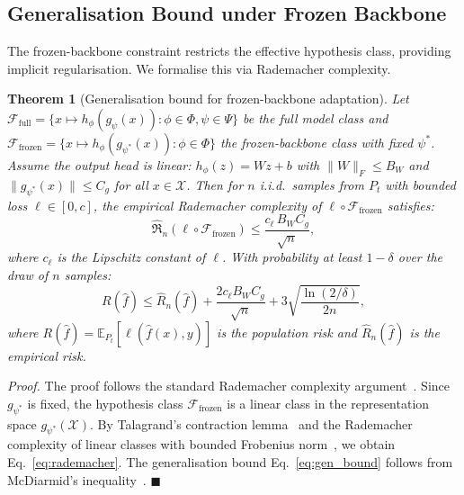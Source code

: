 \documentclass[journal]{IEEEtran}
\newtheorem{theorem}{Theorem}
\renewenvironment{proof}[1][Proof]{\noindent\textit{#1.}\space}{\hfill$\blacksquare$\par\medskip}
\begin{document}
\subsection{Generalisation Bound under Frozen Backbone}
\label{sec:theory_gen}

The frozen-backbone constraint restricts the effective hypothesis class, providing implicit regularisation. We formalise this via Rademacher complexity.

\begin{theorem}[Generalisation bound for frozen-backbone adaptation]
\label{thm:generalization}
Let $\mathcal{F}_{\text{full}} = \{x \mapsto h_\phi(g_\psi(x)) : \phi \in \Phi, \psi \in \Psi\}$ be the full model class and $\mathcal{F}_{\text{frozen}} = \{x \mapsto h_\phi(g_{\psi^*}(x)) : \phi \in \Phi\}$ the frozen-backbone class with fixed $\psi^*$. Assume the output head is linear: $h_\phi(z) = W z + b$ with $\|W\|_F \leq B_W$ and $\|g_{\psi^*}(x)\| \leq C_g$ for all $x \in \mathcal{X}$. Then for $n$ i.i.d.\ samples from $P_t$ with bounded loss $\ell \in [0, c]$, the empirical Rademacher complexity of $\ell \circ \mathcal{F}_{\text{frozen}}$ satisfies:
\begin{equation}
    \hat{\mathfrak{R}}_n(\ell \circ \mathcal{F}_{\text{frozen}}) \leq \frac{c_\ell \, B_W C_g}{\sqrt{n}},
    \label{eq:rademacher}
\end{equation}
where $c_\ell$ is the Lipschitz constant of $\ell$. With probability at least $1 - \delta$ over the draw of $n$ samples:
\begin{equation}
    R(\hat{f}) \leq \hat{R}_n(\hat{f}) + \frac{2 c_\ell B_W C_g}{\sqrt{n}} + 3\sqrt{\frac{\ln(2/\delta)}{2n}},
    \label{eq:gen_bound}
\end{equation}
where $R(\hat{f}) = \mathbb{E}_{P_t}[\ell(\hat{f}(x), y)]$ is the population risk and $\hat{R}_n(\hat{f})$ is the empirical risk.
\end{theorem}

\begin{proof}
The proof follows the standard Rademacher complexity argument~\cite{bartlett2002rademacher}. Since $g_{\psi^*}$ is fixed, the hypothesis class $\mathcal{F}_{\text{frozen}}$ is a linear class in the representation space $g_{\psi^*}(\mathcal{X})$. By Talagrand's contraction lemma~\cite{ledoux2001concentration} and the Rademacher complexity of linear classes with bounded Frobenius norm~\cite{bartlett2002rademacher}, we obtain Eq.~\ref{eq:rademacher}. The generalisation bound Eq.~\ref{eq:gen_bound} follows from McDiarmid's inequality~\cite{mcdiarmid1989method}.
\end{proof}
\end{document}
